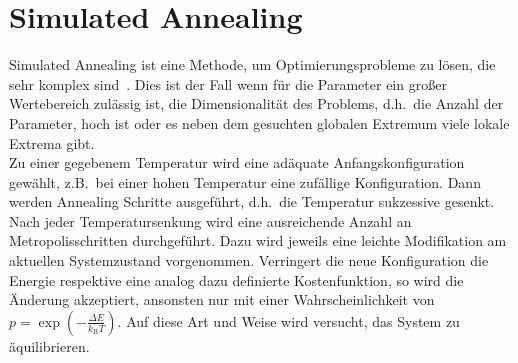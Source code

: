 \section{Simulated Annealing}
Simulated Annealing ist eine Methode, um Optimierungsprobleme zu lösen, die sehr komplex sind~\parencite{nr}. Dies ist der Fall wenn für die Parameter ein großer Wertebereich zulässig ist, die Dimensionalität des Problems, d.h.\ die Anzahl der Parameter, hoch ist oder es neben dem gesuchten globalen Extremum viele lokale Extrema gibt. \\
Zu einer gegebenem Temperatur wird eine adäquate Anfangskonfiguration gewählt, z.B.\ bei einer hohen Temperatur eine zufällige Konfiguration. Dann werden Annealing Schritte ausgeführt, d.h.\ die Temperatur sukzessive gesenkt. Nach jeder Temperatursenkung wird eine ausreichende Anzahl an Metropolisschritten durchgeführt. Dazu wird jeweils eine leichte Modifikation am aktuellen Systemzustand vorgenommen. Verringert die neue Konfiguration die Energie respektive eine analog dazu definierte Kostenfunktion, so wird die Änderung akzeptiert, ansonsten nur mit einer Wahrscheinlichkeit von $p=\exp\left(-\frac{\Delta E}{k_\mathrm{B}T}\right)$. Auf diese Art und Weise wird versucht, das System zu äquilibrieren.



